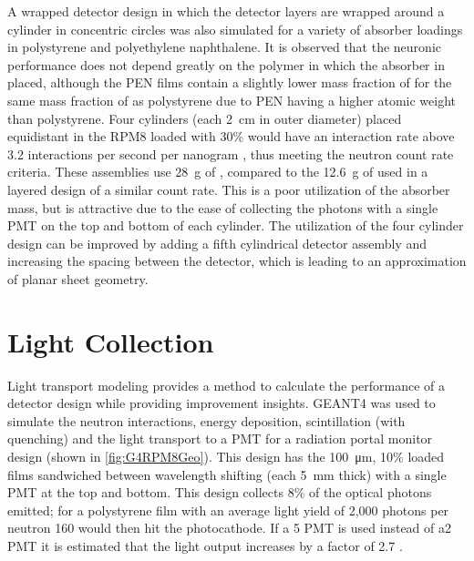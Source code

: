 A wrapped detector design in which the detector layers are wrapped around a cylinder in concentric circles was also simulated for a variety of absorber loadings in polystyrene and polyethylene naphthalene.
It is observed that the neuronic performance does not depend greatly on the polymer in which the absorber in placed, although the PEN films contain a slightly lower mass fraction of  for the same mass fraction of  as polystyrene due to PEN having a higher atomic weight than polystyrene.
Four cylinders (each \SI{2}{\cm} in outer diameter) placed equidistant in the RPM8 loaded with 30\%  would have an interaction rate above 3.2 interactions per second per nanogram , thus meeting the neutron count rate criteria. These assemblies use \SI{28}{\gram} of , compared to the \SI{12.6}{\gram} of  used in a layered design of a similar count rate.
This is a poor utilization of the absorber mass, but is attractive due to the ease of collecting the photons with a single PMT on the top and bottom of each cylinder.
The  utilization of the four cylinder design can be improved by adding a fifth cylindrical detector assembly and increasing the spacing between the detector, which is leading to an approximation of planar sheet geometry.


\section{Light Collection}
Light transport modeling provides a method to calculate the performance of a detector design while providing improvement insights.
GEANT4 was used to simulate the neutron interactions, energy deposition, scintillation (with quenching) and the light transport to a PMT for a radiation portal monitor design (shown in \autoref{fig:G4RPM8Geo}).
This design has the \SI{100}{\um}, 10\% loaded  films sandwiched between wavelength shifting (each \SI{5}{\mm} thick) with a single PMT at the top and bottom.
This design collects 8\% of the optical photons emitted; for a polystyrene film with an average light yield of 2,000 photons per neutron 160 would then hit the photocathode.
If a \SI{5}{\in} PMT is used instead of a\SI{2}{\in} PMT it is estimated that the light output increases by a factor of \num{2.7} \cite{pnnl_14283}.

